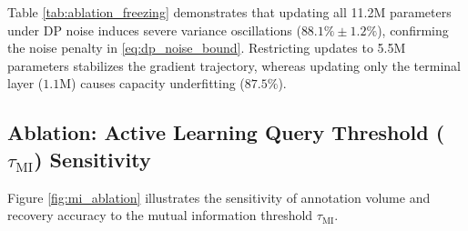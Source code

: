 \documentclass[conference]{IEEEtran}
\begin{document}
\begin{table}[htbp]
\caption{Ablation: Trajectory Stability vs. Freezing Geometry under DP Noise}
\label{tab:ablation_freezing}
\begin{center}
\end{center}
\end{table}

Table \ref{tab:ablation_freezing} demonstrates that updating all 11.2M parameters under DP noise induces severe variance oscillations ($88.1\% \pm 1.2\%$), confirming the noise penalty in \eqref{eq:dp_noise_bound}. Restricting updates to 5.5M parameters stabilizes the gradient trajectory, whereas updating only the terminal layer ($1.1\text{M}$) causes capacity underfitting ($87.5\%$).

\subsection{Ablation: Active Learning Query Threshold ($\tau_{\mathrm{MI}}$) Sensitivity}
Figure \ref{fig:mi_ablation} illustrates the sensitivity of annotation volume and recovery accuracy to the mutual information threshold $\tau_{\mathrm{MI}}$.
\end{document}
